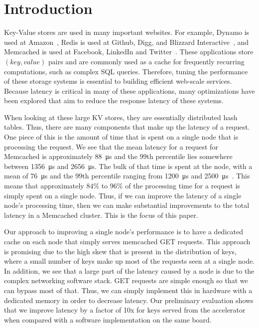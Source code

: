 \section{Introduction}
Key-Value stores are used in many important websites. For example, 
Dynamo is used at Amazon~\cite{dynamo}, Redis is used at Github, Digg, and Blizzard
Interactive~\cite{Reddi10}, and Memcached is used at Facebook, LinkedIn and
Twitter~\cite{memcached, Petrovic08}. These applications store $(key, value)$ 
pairs and are commonly used as a cache for frequently recurring computations, 
such as complex SQL queries. Therefore, tuning the performance of these 
storage systems is essential to building efficient web-scale services.
Because latency is critical in many of these applications, many optimizations 
have been explored that aim to reduce the response latency of these systems. 

When looking at these large KV stores, they are essentially distributed hash
tables. Thus, there are many components that make up the latency of a request.
One piece of this is the amount of time that is spent on a single node that is
processing the request. We see that the mean latency for a request for
Memcached is approximately \SI{88}{\micro\s} and the $99$th percentile lies
somewhere between \SI{1356}{\micro\s} and \SI{2656}{\micro\s}.  The bulk
of that time is spent at the node, with a mean of \SI{76}{\micro\s} and
the $99$th percentile ranging from \SI{1200}{\micro\s} and
\SI{2500}{\micro\s}~\cite{Kapoor2012}.  This means that approximately
$84\%$ to $96\%$ of the processing time for a request is simply spent on a
single node. Thus, if we can improve the latency of a single node's processing
time, then we can make substantial improvements to the total latency in a
Memcached cluster. This is the focus of this paper.

Our approach to improving a single node's performance is to have a dedicated
cache on each node that simply serves memcached GET requests. This approach is
promising due to the high skew that is present in the distribution of keys,
where a small number of keys make up most of the requests seen at a single
node. In addition, we see that a large part of the latency caused by a node is
due to the complex networking software stack. GET requests are simple enough so
that we can bypass most of that. Thus, we can simply implement this in hardware
with a dedicated memory in order to decrease latency. Our preliminary
evaluation shows that we improve latency by a factor of 10x for keys served
from the accelerator when compared with a software implementation on the same
board.
